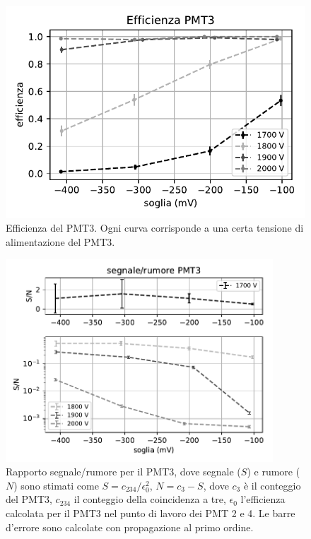 \documentclass[a4paper]{article}
\begin{document}
\begin{figure}
	\centering
	\includegraphics[width=8 cm]{efficienza}
	\caption{\label{eff}%
	Efficienza del PMT3.
	Ogni curva corrisponde a una certa tensione di alimentazione del PMT3.}
\end{figure}

\begin{figure}
	\centering
	\includegraphics[width=10cm]{SN3}
	\caption{%
	\label{fig:sn3}%
	Rapporto segnale/rumore per il PMT3,
	dove segnale ($S$) e rumore ($N$) sono stimati come
	$S=c_{234}/\epsilon_0^2$,
	$N=c_3 - S$,
	dove $c_3$ è il conteggio del PMT3,
	$c_{234}$ il conteggio della coincidenza a tre,
	$\epsilon_0$ l'efficienza calcolata per il PMT3 nel punto di lavoro dei PMT 2 e 4.
	Le barre d'errore sono calcolate con propagazione al primo ordine.}
\end{figure}
\end{document}
